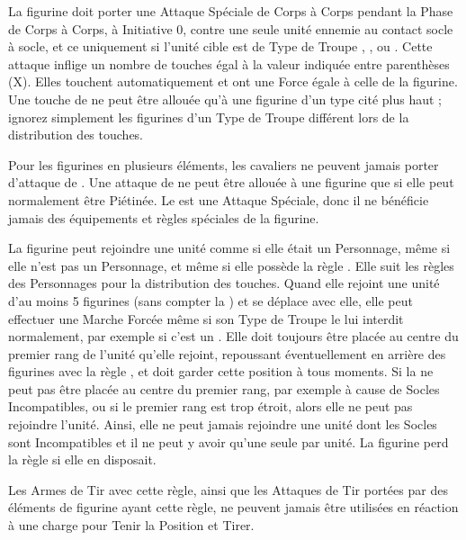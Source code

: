 
La figurine doit porter une Attaque Spéciale de Corps à Corps pendant la Phase de Corps à Corps, à Initiative 0, contre une seule unité ennemie au contact socle à socle, et ce uniquement si l'unité cible est de Type de Troupe \infantry{}, \warbeast{}, \swarm{} ou \newfromWHB{\warmachine}. Cette attaque inflige un nombre de touches égal à la valeur indiquée entre parenthèses (X). Elles touchent automatiquement et ont une Force égale à celle de la figurine. Une touche de \stomp{} ne peut être allouée qu'à une figurine d'un type cité plus haut ; ignorez simplement les figurines d'un Type de Troupe différent lors de la distribution des touches.

Pour les figurines en plusieurs éléments, les cavaliers ne peuvent jamais porter d'attaque de \stomp{}. Une attaque de \stomp{} ne peut être allouée à une figurine que si elle peut normalement être Piétinée. Le \stomp{} est une Attaque Spéciale, donc il ne bénéficie jamais des équipements et règles spéciales de la figurine.


La figurine peut rejoindre une unité comme si elle était un Personnage, même si elle n'est pas un Personnage, et même si elle possède la règle \largetarget{}. Elle suit les règles des Personnages pour la distribution des touches. Quand elle rejoint une unité d'au moins 5 figurines (sans compter la \warplatform{}) et se déplace avec elle, elle peut effectuer une Marche Forcée même si son Type de Troupe le lui interdit normalement, par exemple si c'est un \chariot{}. Elle doit toujours être placée au centre du premier rang de l'unité qu'elle rejoint, repoussant éventuellement en arrière des figurines avec la règle \frontrank{}, et doit garder cette position à tous moments. Si la \warplatform{} ne peut pas être placée au centre du premier rang, par exemple à cause de Socles Incompatibles, ou si le premier rang est trop étroit, alors elle ne peut pas rejoindre l'unité. Ainsi, elle ne peut jamais rejoindre une unité dont les Socles sont Incompatibles et il ne peut y avoir qu'une seule \warplatform{} par unité. La figurine perd la règle \swiftstride{} si elle en disposait.


Les Armes de Tir avec cette règle, ainsi que les Attaques de Tir portées par des éléments de figurine ayant cette règle, ne peuvent jamais être utilisées en réaction à une charge pour Tenir la Position et Tirer.

